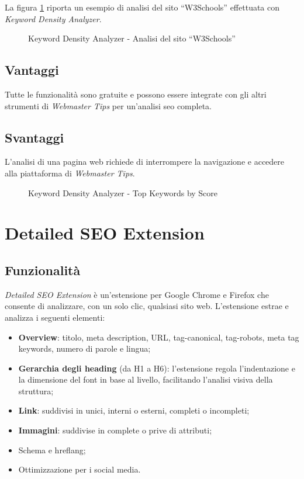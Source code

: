 \vspace{10pt}
\noindent La figura \ref{fig:keyword_density_analyzer_w3schools} riporta un esempio di analisi del sito “W3Schools” effettuata con \textit{Keyword Density Analyzer}.

\begin{figure}[H]
    \centering 
    \caption{Keyword Density Analyzer - Analisi del sito “W3Schools”}
    \label{fig:keyword_density_analyzer_w3schools}
\end{figure}

\subsection{Vantaggi}
Tutte le funzionalità sono gratuite e possono essere integrate con gli altri strumenti di \textit{Webmaster Tips} per un'analisi \gls{seo} completa.

\subsection{Svantaggi}
L'analisi di una pagina web richiede di interrompere la navigazione e accedere alla piattaforma di \textit{Webmaster Tips}.

\begin{figure}[H]
    \centering 
    \caption{Keyword Density Analyzer - Top Keywords by Score}
    \label{fig:keyword_density_analyzer}
\end{figure}

\section{Detailed SEO Extension}

\subsection{Funzionalità}
\textit{Detailed SEO Extension} è un'estensione per Google Chrome e Firefox che consente di analizzare, con un solo clic, qualsiasi sito web. L'estensione estrae e analizza i seguenti elementi:
\begin{itemize}
    \item \textbf{Overview}: titolo, meta description, URL, \gls{tag-canonical}, \gls{tag-robots}, meta tag keywords, numero di parole e lingua;
    \item \textbf{Gerarchia degli heading} (da H1 a H6): l'estensione regola l'indentazione e la dimensione del font in base al livello, facilitando l'analisi visiva della struttura;
    \item \textbf{Link}: suddivisi in unici, interni o esterni, completi o incompleti;
    \item \textbf{Immagini}: suddivise in complete o prive di attributi;
    \item Schema e \gls{hreflang};
    \item Ottimizzazione per i social media.
\end{itemize}

